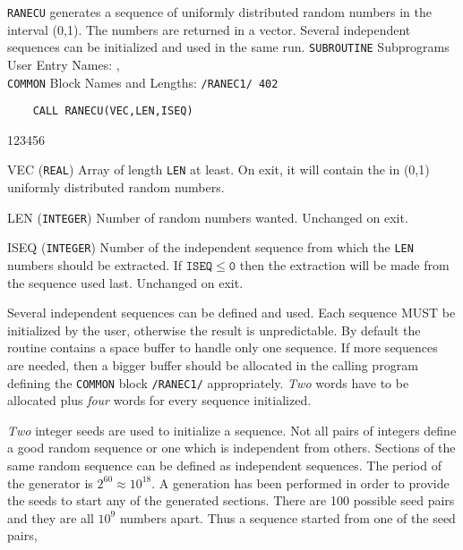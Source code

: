                          
             
          
{\tt RANECU} generates a sequence of uniformly distributed random numbers
in the interval (0,1). The numbers are returned in a vector. Several
independent sequences can be initialized and used in the same run.
\Structure
{\tt SUBROUTINE} Subprograms\\
User Entry Names: ,  \\
{\tt COMMON} Block Names and Lengths: {\tt /RANEC1/ 402}
\Usage
\begin{verbatim}
    CALL RANECU(VEC,LEN,ISEQ)
\end{verbatim}
\begin{DLtt}{123456}
\item [VEC] ({\tt REAL}) Array of length {\tt LEN} at least.
On exit, it will contain the in (0,1) uniformly distributed random
numbers.
\item [LEN] ({\tt INTEGER}) Number of random numbers wanted. Unchanged
on exit.
\item [ISEQ] ({\tt INTEGER}) Number of the independent sequence from
which the {\tt LEN} numbers should be extracted. If $\mathtt{ISEQ \leq 0}$
then the extraction will be made from the sequence used last.
Unchanged on exit.
\end{DLtt}
Several independent sequences can be defined and used. Each sequence
MUST be initialized by the user, otherwise the result is unpredictable.
By default the routine contains a space buffer to handle only one
sequence. If more sequences are needed, then a bigger buffer should be
allocated in the calling program defining the {\tt COMMON} block
{\tt /RANEC1/}  appropriately. {\it Two} words have to be allocated plus
{\it four} words for every sequence initialized.
\par
{\it Two} integer seeds are used to initialize a sequence.
Not all pairs of integers  define a good random sequence
or one which is independent from others. Sections of the same random
sequence can be defined as independent sequences. The period of the
generator is $2^{60} \approx 10^{18}$. A generation has been performed
in order to provide the seeds to start any of the generated sections.
There are 100 possible seed pairs and they are all $10^9$ numbers
apart. Thus a sequence started from one of the seed pairs,
